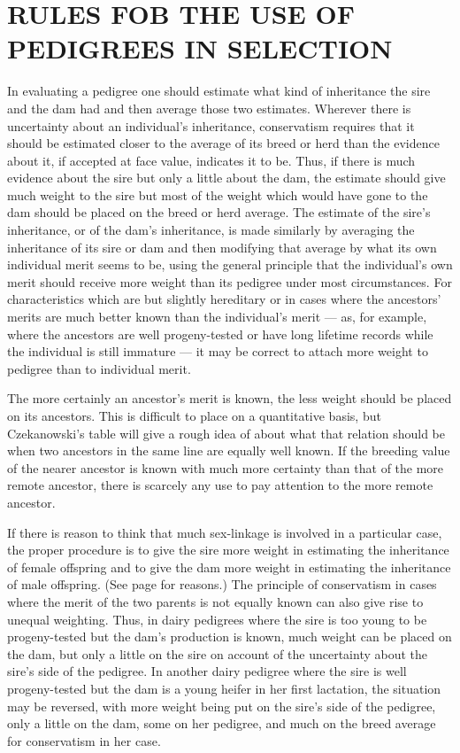 \section*{RULES FOB THE USE OF PEDIGREES IN SELECTION}

In evaluating a pedigree one should estimate what kind of inheritance
the sire and the dam had and then average those two estimates.
Wherever there is uncertainty about an individual's inheritance, conservatism
requires that it should be estimated closer to the average of
its breed or herd than the evidence about it, if accepted at face value,
indicates it to be. Thus, if there is much evidence about the sire but
only a little about the dam, the estimate should give much weight to the
sire but most of the weight which would have gone to the dam should
be placed on the breed or herd average. The estimate of the sire's inheritance,
or of the dam's inheritance, is made similarly by averaging the
inheritance of its sire or dam and then modifying that average by what
its own individual merit seems to be, using the general principle that
the individual's own merit should receive more weight than its pedigree
under most circumstances. For characteristics which are but slightly
hereditary or in cases where the ancestors' merits are much better
known than the individual's merit --- as, for example, where the ancestors
are well progeny-tested or have long lifetime records while the individual
is still immature --- it may be correct to attach more weight to
pedigree than to individual merit.

The more certainly an ancestor's merit is known, the less weight
should be placed on its ancestors. This is difficult to place on a quantitative
basis, but Czekanowski's table will give a rough idea of about
what that relation should be when two ancestors in the same line are
equally well known. If the breeding value of the nearer ancestor is
known with much more certainty than that of the more remote ancestor,
there is scarcely any use to pay attention to the more remote
ancestor.

If there is reason to think that much sex-linkage is involved in a
particular case, the proper procedure is to give the sire more weight in
estimating the inheritance of female offspring and to give the dam more
weight in estimating the inheritance of male offspring. (See page \pageref{page255}
for reasons.) The principle of conservatism in cases where the merit of
the two parents is not equally known can also give rise to unequal
weighting. Thus, in dairy pedigrees where the sire is too young to be
progeny-tested but the dam's production is known, much weight can be
placed on the dam, but only a little on the sire on account of the uncertainty
about the sire's side of the pedigree. In another dairy pedigree
where the sire is well progeny-tested but the dam is a young heifer in
her first lactation, the situation may be reversed, with more weight
being put on the sire's side of the pedigree, only a little on the dam,
some on her pedigree, and much on the breed average for conservatism
in her case.
\noclub[3]

